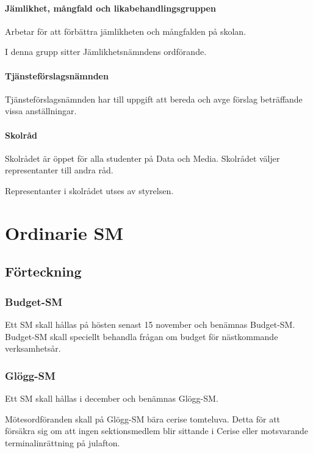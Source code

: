\documentclass{dgovdoc}
\begin{document}
\paragraph{Jämlikhet, mångfald och likabehandlingsgruppen}

Arbetar för att förbättra jämlikheten och mångfalden på skolan.

I denna grupp sitter Jämlikhetsnämndens ordförande.

\paragraph{Tjänsteförslagsnämnden}

Tjänsteförslagsnämnden har till uppgift att bereda och avge förslag beträffande
vissa anställningar.

\paragraph{Skolråd}
Skolrådet är öppet för alla studenter på Data och Media. Skolrådet väljer representanter till andra råd.

Representanter i skolrådet utses av styrelsen.

\section{Ordinarie SM}

\subsection{Förteckning}

\subsubsection{Budget-SM}

Ett SM skall hållas på hösten senast 15 november och benämnas Budget-SM.
Budget-SM skall speciellt behandla frågan om budget för nästkommande
verksamhetsår.

\subsubsection{Glögg-SM}

Ett SM skall hållas i december och benämnas Glögg-SM.

Mötesordföranden skall på Glögg-SM bära cerise tomteluva. Detta för att
försäkra sig om att ingen sektionsmedlem blir sittande i Cerise eller
motsvarande terminalinrättning på julafton.
\end{document}
